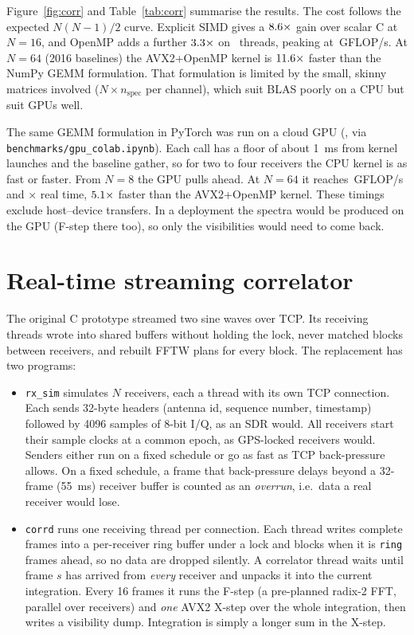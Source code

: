 \documentclass[11pt,a4paper]{article}
\begin{document}


Figure~\ref{fig:corr} and Table~\ref{tab:corr} summarise the results. The cost follows the expected
$N(N-1)/2$ curve. Explicit SIMD gives a $8.6\times$ gain over scalar C at $N=16$, and
OpenMP adds a further $3.3\times$ on \ThreadsMax\ threads, peaking at
\GflopsOmpPeak\,GFLOP/s. At $N=64$ (2016 baselines) the AVX2+OpenMP kernel is
$11.6\times$ faster than the NumPy GEMM formulation. That formulation is limited
by the small, skinny matrices involved ($N\times n_{\text{spec}}$ per channel), which suit BLAS poorly
on a CPU but suit GPUs well.

The same GEMM formulation in PyTorch was run on a cloud GPU (\GpuHost, via
\texttt{benchmarks/gpu\_colab.ipynb}). Each call has a floor of about \SI{1}{ms} from kernel
launches and the baseline gather, so for two to four receivers the CPU kernel is as fast or faster.
From $N=8$ the GPU pulls ahead. At $N=64$ it reaches \GflopsCudaPeak\,GFLOP/s and
\RtfCudaSixtyFour$\times$ real time, $5.1\times$ faster than the AVX2+OpenMP
kernel. These timings exclude host--device transfers. In a deployment the spectra would be produced
on the GPU (F-step there too), so only the visibilities would need to come back.

\section{Real-time streaming correlator}\label{sec:stream}

The original C prototype streamed two sine waves over TCP. Its receiving threads wrote into shared
buffers without holding the lock, never matched blocks between receivers, and rebuilt FFTW plans for
every block. The replacement has two programs:

\begin{itemize}
\item \texttt{rx\_sim} simulates $N$ receivers, each a thread with its own TCP connection. Each sends
32-byte headers (antenna id, sequence number, timestamp) followed by 4096 samples of 8-bit I/Q, as an
SDR would. All receivers start their sample clocks at a common epoch, as GPS-locked receivers would.
Senders either run on a fixed schedule or go as fast as TCP back-pressure allows. On a fixed
schedule, a frame that back-pressure delays beyond a 32-frame (\SI{55}{ms}) receiver buffer is
counted as an \emph{overrun}, i.e.\ data a real receiver would lose.
\item \texttt{corrd} runs one receiving thread per connection. Each thread writes complete frames
into a per-receiver ring buffer under a lock and blocks when it is \texttt{ring} frames ahead, so no
data are dropped silently. A correlator thread waits until frame $s$ has arrived from \emph{every}
receiver and unpacks it into the current integration. Every 16 frames it runs the F-step (a
pre-planned radix-2 FFT, parallel over receivers) and \emph{one} AVX2 X-step over the whole
integration, then writes a visibility dump. Integration is simply a longer sum in the X-step.
\end{itemize}
\end{document}
